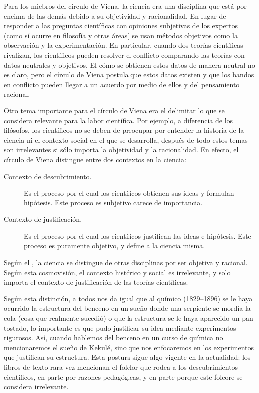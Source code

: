 Para los miebros del círculo de Viena, la ciencia era una disciplina que está
por encima de las demás debido a su objetividad y racionalidad.
En lugar de responder a las preguntas científicas con opiniones subjetivas de
los expertos (como sí ocurre en filosofía y otras áreas) se usan métodos
objetivos como la observación y la experimentación.
En particular, cuando dos teorías científicas rivalizan, los científicos pueden
resolver el conflicto comparando las teorías con datos neutrales y objetivos.
El cómo se obtienen estos datos de manera neutral no es claro, pero el círculo
de Viena postula que estos datos existen y que los bandos en conflicto pueden
llegar a un acuerdo por medio de ellos y del pensamiento racional.

Otro tema importante para el círculo de Viena era el delimitar lo que se
considera relevante para la labor científica.
Por ejemplo, a diferencia de los filósofos, los científicos no se deben de
preocupar por entender la historia de la ciencia ni el contexto social en el que
se desarrolla, después de todo estos temas son irrelevantes si sólo importa la
objetividad y la racionalidad.
En efecto, el círculo de Viena distingue entre dos contextos en la ciencia:
\begin{description}
    \item[Contexto de descubrimiento.] Es el proceso por el cual los científicos
        obtienen sus ideas y formulan hipótesis.
        Este proceso es subjetivo carece de importancia.
    \item[Contexto de justificación.] Es el proceso por el cual los científicos
        justifican las ideas e hipótesis.
        Este proceso es puramente objetivo, y define a la ciencia misma.
\end{description}


\begin{remember}
    \label{rem:circulodeviena}
    Según el , la ciencia se distingue de otras
    disciplinas por ser objetiva y racional.
    Según esta cosmovisión, el contexto histórico y social es irrelevante, y
    solo importa el contexto de justificación de las teorías científicas.
\end{remember}

Según esta distinción, a todos nos da igual que al químico  (1829--1896) se le haya ocurrido la
estructura del benceno en un sueño donde una serpiente se mordía la cola (cosa
que realmente sucedió) o que la estructura se le haya aparecido un pan tostado,
lo importante es que pudo justificar su idea mediante experimentos rigurosos.
Así, cuando hablemos del benceno en un curso de química no mencionaremos el
sueño de Kekulé, sino que nos enfocaremos en los experimentos que justifican
su estructura.
Esta postura sigue algo vigente en la actualidad: los libros de texto rara vez
mencionan el folclor que rodea a los descubrimientos científicos, en parte por
razones pedagógicas, y en parte porque este folcore se considera irrelevante.

